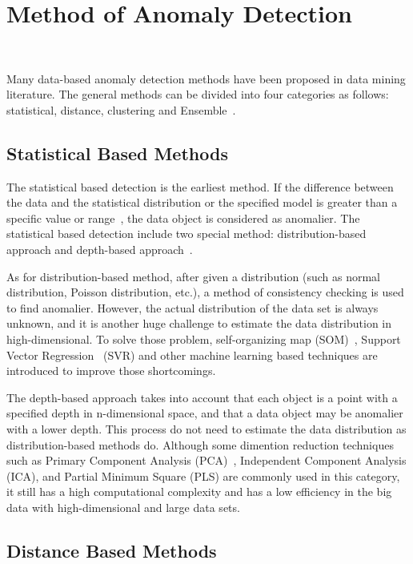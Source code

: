 \section{Method of Anomaly Detection}~\label{sec-method}

Many data-based anomaly detection methods have been proposed in
data mining literature.
The general methods can be divided into four categories as follows:
statistical,
distance,
clustering and Ensemble~\cite{cook2019anomaly}.

\subsection{Statistical Based Methods}

The statistical based detection is the earliest method. 
If the difference between the data and the statistical 
distribution or the specified model 
is greater than a specific value or range~\cite{chandola2009anomaly}, 
the data object is considered as anomalier. 
The statistical based detection include two special method: 
distribution-based approach and 
depth-based approach~\cite{wu2016survey}.

As for distribution-based method,
after given a distribution (such as
normal distribution,
Poisson distribution,
etc.),
a method of consistency checking is used to find anomalier.
However,
the actual distribution of the data set is always unknown,
and it is another huge challenge to
estimate the data distribution in high-dimensional.
To solve those problem,
self-organizing map (SOM)~\cite{siripanadorn2010anomaly},
Support Vector Regression~\cite{kromanis2013support} (SVR) and
other machine learning based techniques are introduced to
improve those shortcomings.

The depth-based approach takes into account 
that each object is a point with 
a specified depth in n-dimensional space, 
and that a data object  may be anomalier with a lower depth. 
This process do not need to estimate the data distribution as
distribution-based methods do. 
Although some dimention reduction techniques such as  
Primary Component Analysis (PCA)~\cite{deng2013modified}, 
Independent Component Analysis (ICA), 
and Partial Minimum Square (PLS)\cite{yin2014improved} 
are commonly used in this category,
it still has a high computational complexity and 
has a low efficiency in the big data with 
high-dimensional and large data sets.

\subsection{Distance Based Methods}

